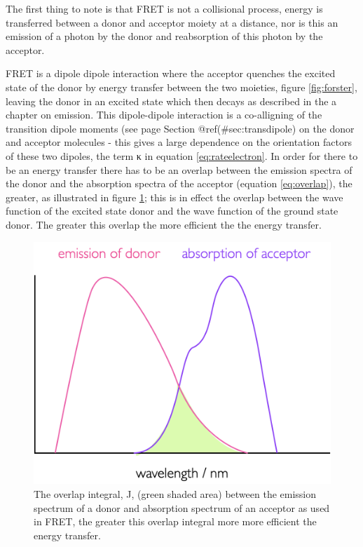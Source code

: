 \documentclass[
]{book}
\begin{document}
The first thing to note is that FRET is not a collisional process, energy is transferred between a donor and acceptor moiety at a distance, nor is this an emission of a photon by the donor and reabsorption of this photon by the acceptor.

FRET is a dipole dipole interaction where the acceptor quenches the excited state of the donor by energy transfer between the two moieties, figure \ref{fig:forster}, leaving the donor in an excited state which then decays as described in the a chapter on emission. This dipole-dipole interaction is a co-alligning of the transition dipole moments (see page Section @ref(\#sec:transdipole) on the donor and acceptor molecules - this gives a large dependence on the orientation factors of these two dipoles, the term κ in equation \eqref{eq:rateelectron}. In order for there to be an energy transfer there has to be an overlap between the emission spectra of the donor and the absorption spectra of the acceptor (equation \eqref{eq:overlap}), the greater, as illustrated in figure \ref{fig:overlapintegral}; this is in effect the overlap between the wave function of the excited state donor and the wave function of the ground state donor. The greater this overlap the more efficient the the energy transfer.

\begin{figure}

{\centering \includegraphics[width=0.7\linewidth]{images/overlapintegral} 

}

\caption{The overlap integral, J, (green shaded area) between the emission spectrum of a donor and absorption spectrum of an acceptor as used in FRET, the greater this overlap integral more more efficient the energy transfer.}\label{fig:overlapintegral}
\end{figure}
\end{document}

